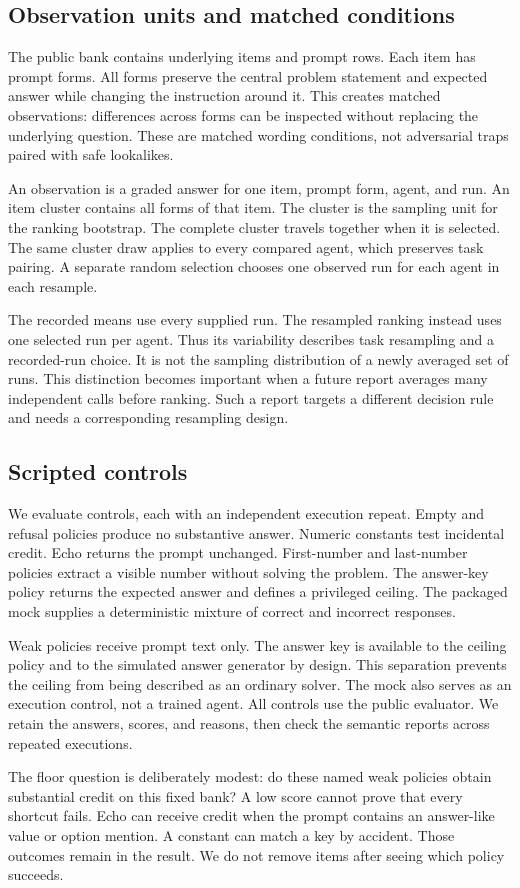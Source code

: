 \documentclass{article}
\begin{document}
\subsection{Observation units and matched conditions}
The public bank contains \Items{} underlying items and \Tasks{} prompt rows. Each item has \Variants{} prompt forms. All forms preserve the central problem statement and expected answer while changing the instruction around it. This creates matched observations: differences across forms can be inspected without replacing the underlying question. These are matched wording conditions, not adversarial traps paired with safe lookalikes.\par
An observation is a graded answer for one item, prompt form, agent, and run. An item cluster contains all forms of that item. The cluster is the sampling unit for the ranking bootstrap. The complete cluster travels together when it is selected. The same cluster draw applies to every compared agent, which preserves task pairing. A separate random selection chooses one observed run for each agent in each resample.\par
The recorded means use every supplied run. The resampled ranking instead uses one selected run per agent. Thus its variability describes task resampling and a recorded-run choice. It is not the sampling distribution of a newly averaged set of runs. This distinction becomes important when a future report averages many independent calls before ranking. Such a report targets a different decision rule and needs a corresponding resampling design.\par
\subsection{Scripted controls}
We evaluate \PolicyCount{} controls, each with an independent execution repeat. Empty and refusal policies produce no substantive answer. Numeric constants test incidental credit. Echo returns the prompt unchanged. First-number and last-number policies extract a visible number without solving the problem. The answer-key policy returns the expected answer and defines a privileged ceiling. The packaged mock supplies a deterministic mixture of correct and incorrect responses.\par
Weak policies receive prompt text only. The answer key is available to the ceiling policy and to the simulated answer generator by design. This separation prevents the ceiling from being described as an ordinary solver. The mock also serves as an execution control, not a trained agent. All controls use the public evaluator. We retain the answers, scores, and reasons, then check the semantic reports across repeated executions.\par
The floor question is deliberately modest: do these named weak policies obtain substantial credit on this fixed bank? A low score cannot prove that every shortcut fails. Echo can receive credit when the prompt contains an answer-like value or option mention. A constant can match a key by accident. Those outcomes remain in the result. We do not remove items after seeing which policy succeeds.\par
\end{document}
